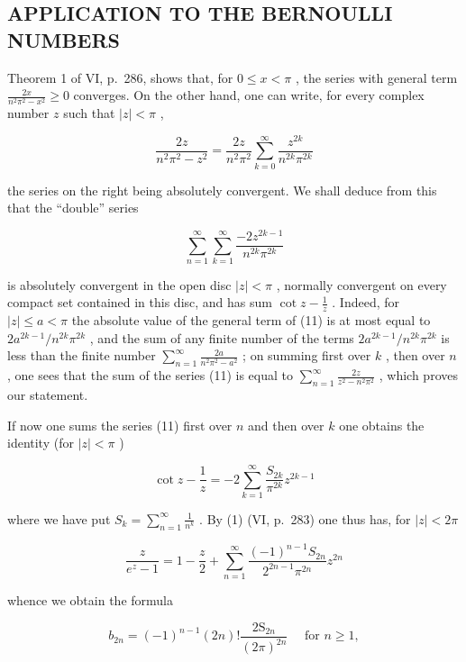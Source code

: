 \subsection{APPLICATION TO THE BERNOULLI NUMBERS}

Theorem 1 of VI, p.~286, shows that, for \(0 \leqslant x < \pi\) , the series with general term \(\frac{2x}{n^2\pi^2 - x^2} \geqslant 0\) converges. On the other hand, one can write, for every complex number \(z\) such that \(|z| < \pi\) ,

\[
{\frac {2 z}{n ^ {2} \pi^ {2} - z ^ {2}}} = {\frac {2 z}{n ^ {2} \pi^ {2}}} \sum_ {k = 0} ^ {\infty} {\frac {z ^ {2 k}}{n ^ {2 k} \pi^ {2 k}}}
\]

the series on the right being absolutely convergent. We shall deduce from this that the ``double'' series

\[
\sum_ {n = 1} ^ {\infty} \sum_ {k = 1} ^ {\infty} \frac {- 2 z ^ {2 k - 1}}{n ^ {2 k} \pi^ {2 k}}\tag{11}
\]

is absolutely convergent in the open disc \(|z| < \pi\) , normally convergent on every compact set contained in this disc, and has sum \(\cot z - \frac{1}{z}\) . Indeed, for \(|z| \leqslant a < \pi\) the absolute value of the general term of (11) is at most equal to \(2a^{2k-1}/n^{2k}\pi^{2k}\) , and the sum of any finite number of the terms \(2a^{2k-1}/n^{2k}\pi^{2k}\) is less than the finite number \(\sum_{n=1}^{\infty} \frac{2a}{n^2\pi^2 - a^2}\) ; on summing first over \(k\) , then over \(n\) , one sees that the sum of the series (11) is equal to \(\sum_{n=1}^{\infty} \frac{2z}{z^2 - n^2\pi^2}\) , which proves our statement.

If now one sums the series (11) first over \(n\) and then over \(k\) one obtains the identity (for \(|z| < \pi\) )

\[
\cot z - \frac {1}{z} = - 2 \sum_ {k = 1} ^ {\infty} \frac {S _ {2 k}}{\pi^ {2 k}} z ^ {2 k - 1}\tag{12}
\]

where we have put \(S_{k} = \sum_{n=1}^{\infty} \frac{1}{n^{k}}\) . By (1) (VI, p.~283) one thus has, for \(|z| < 2\pi\)

\[
\frac {z}{e ^ {z} - 1} = 1 - \frac {z}{2} + \sum_ {n = 1} ^ {\infty} \frac {(- 1) ^ {n - 1} S _ {2 n}}{2 ^ {2 n - 1} \pi^ {2 n}} z ^ {2 n}\tag{13}
\]

whence we obtain the formula

\[
b _ {2 n} = (- 1) ^ {n - 1} (2 n)! \frac {2 \mathrm{S} _ {2 n}}{(2 \pi) ^ {2 n}} \quad \text {   for   } n \geqslant 1,\tag{14}
\]

